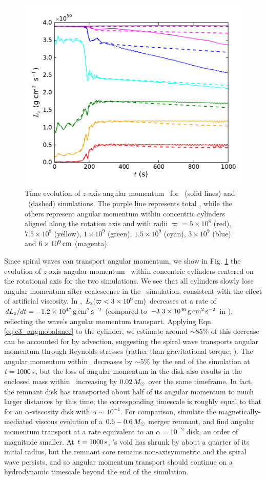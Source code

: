 \begin{figure}
\centering
\includegraphics[angle=0,width=0.6\columnwidth]{chapter3_zhu+u/figures/Lz.pdf}
\caption{Time evolution of $z$-axis angular momentum \Lz\ for \arepo\ (solid lines) and \gasoline\ (dashed) simulations.  The purple line represents total \Lz, while the others represent angular momentum within concentric cylinders aligned along the rotation axis and with radii $\varpi = 5\times10^8$ (red), $7.5\times10^8$ (yellow), $1\times10^9$ (green), $1.5\times10^9$ (cyan), $3\times10^9$ (blue) and $6\times10^9\,\mathrm{cm}$ (magenta).}
\label{fig:c3_angmo}
\end{figure}

Since spiral waves can transport angular momentum, we show in Fig. \ref{fig:c3_angmo} the evolution of $z$-axis angular momentum \Lz\ within concentric cylinders centered on the rotational axis for the two simulations.  We see that all cylinders slowly lose angular momentum after coalescence in the \gasoline\ simulation, consistent with the effect of artificial viscosity.  In \arepo, $\Lz(\varpi < 3\times10^9\,\mrm{cm})$ decreases at a rate of $d\Lz/dt = -1.2\times10^{47}\,\mrm{g}\,\mrm{cm}^2\,\mrm{s}^{-2}$ (compared to $-3.3\times10^{46}\,\mathrm{g}\,\mathrm{cm}^2\,\mathrm{s}^{-2}$ in \gasoline), reflecting the wave's angular momentum transport.  Applying Eqn. \ref{eq:c3_angmobalance} to the cylinder, we estimate around $\sim85$\% of this decrease can be accounted for by advection, suggesting the spiral wave transports angular momentum through Reynolds stresses (rather than gravitational torque; \citealt{kratl16}).  The angular momentum within \innercyl\ decreases by $\sim5$\% by the end of the simulation at $t = 1000\,\mathrm{s}$, but the loss of angular momentum in the disk also results in the enclosed mass within \innercyl\ increasing by $0.02\,\Msun$ over the same timeframe.  In fact, the remnant disk has transported about half of its angular momentum to much larger distances by this time; the corresponding timescale is roughly equal to that for an $\alpha$-viscosity disk with $\alpha \sim 10^{-1}$.  For comparison, \cite{ji+13} simulate the magnetically-mediated viscous evolution of a $0.6-0.6\,\Msun$ merger remnant, and find angular momentum transport at a rate equivalent to an $\alpha = 10^{-2}$ disk, an order of magnitude smaller.  At $t = 1000\,\mathrm{s}$, \arepo's void has shrunk by about a quarter of its initial radius, but the remnant core remains non-axisymmetric and the spiral wave persists, and so angular momentum transport should continue on a hydrodynamic timescale beyond the end of the simulation.

